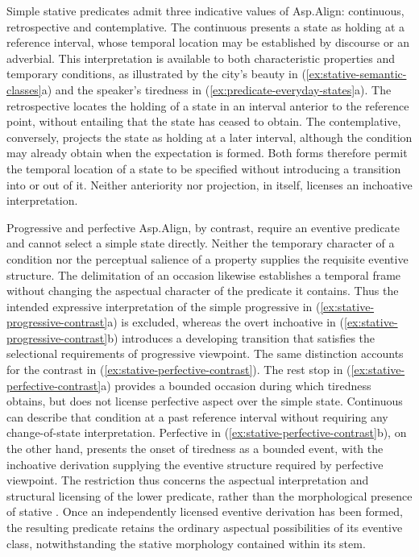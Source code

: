 Simple stative predicates admit three indicative values of Asp.Align:
continuous, retrospective and contemplative. The continuous presents a state
as holding at a reference interval, whose temporal location may be
established by discourse or an adverbial. This interpretation is available
to both characteristic properties and temporary conditions, as illustrated
by the city's beauty in (\ref{ex:stative-semantic-classes}a) and the
speaker's tiredness in (\ref{ex:predicate-everyday-states}a). The
retrospective locates the holding of a state in an interval anterior to the
reference point, without entailing that the state has ceased to obtain. The
contemplative, conversely, projects the state as holding at a later
interval, although the condition may already obtain when the expectation
is formed. Both forms therefore permit the temporal location of a state to
be specified without introducing a transition into or out of it. Neither
anteriority nor projection, in itself, licenses an inchoative interpretation.

Progressive and perfective Asp.Align, by contrast, require an eventive
predicate and cannot select a simple state directly. Neither the temporary
character of a condition nor the perceptual salience of a property supplies
the requisite eventive structure. The delimitation of an occasion likewise
establishes a temporal frame without changing the aspectual character of the
predicate it contains. Thus the intended expressive interpretation of the
simple progressive in (\ref{ex:stative-progressive-contrast}a) is excluded,
whereas the overt inchoative in (\ref{ex:stative-progressive-contrast}b)
introduces a developing transition that satisfies the selectional
requirements of progressive viewpoint. The same distinction accounts for
the contrast in (\ref{ex:stative-perfective-contrast}). The rest stop in
(\ref{ex:stative-perfective-contrast}a) provides a bounded occasion during
which tiredness obtains, but does not license perfective aspect over the
simple state. Continuous  can describe that condition at a past
reference interval without requiring any change-of-state interpretation.
Perfective  in (\ref{ex:stative-perfective-contrast}b), on the
other hand, presents the onset of tiredness as a bounded event, with the
inchoative derivation supplying the eventive structure required by
perfective viewpoint. The restriction thus concerns the aspectual
interpretation and structural licensing of the lower predicate, rather than
the morphological presence of stative . Once an independently
licensed eventive derivation has been formed, the resulting predicate
retains the ordinary aspectual possibilities of its eventive class,
notwithstanding the stative morphology contained within its stem.

